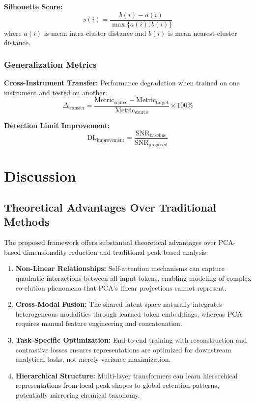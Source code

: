 \documentclass[12pt,a4paper]{article}
\begin{document}
\textbf{Silhouette Score:}
\begin{equation}
s(i) = \frac{b(i) - a(i)}{\max\{a(i), b(i)\}}
\end{equation}
where $a(i)$ is mean intra-cluster distance and $b(i)$ is mean nearest-cluster distance.

\subsubsection{Generalization Metrics}

\textbf{Cross-Instrument Transfer:} Performance degradation when trained on one instrument and tested on another:
\begin{equation}
\Delta_{\text{transfer}} = \frac{\text{Metric}_{\text{source}} - \text{Metric}_{\text{target}}}{\text{Metric}_{\text{source}}} \times 100\%
\end{equation}

\textbf{Detection Limit Improvement:}
\begin{equation}
\text{DL}_{\text{improvement}} = \frac{\text{SNR}_{\text{baseline}}}{\text{SNR}_{\text{proposed}}}
\end{equation}

\section{Discussion}

\subsection{Theoretical Advantages Over Traditional Methods}

The proposed framework offers substantial theoretical advantages over PCA-based dimensionality reduction and traditional peak-based analysis:

\begin{enumerate}
    \item \textbf{Non-Linear Relationships:} Self-attention mechanisms can capture quadratic interactions between all input tokens, enabling modeling of complex co-elution phenomena that PCA's linear projections cannot represent.
    
    \item \textbf{Cross-Modal Fusion:} The shared latent space naturally integrates heterogeneous modalities through learned token embeddings, whereas PCA requires manual feature engineering and concatenation.
    
    \item \textbf{Task-Specific Optimization:} End-to-end training with reconstruction and contrastive losses ensures representations are optimized for downstream analytical tasks, not merely variance maximization.
    
    \item \textbf{Hierarchical Structure:} Multi-layer transformers can learn hierarchical representations from local peak shapes to global retention patterns, potentially mirroring chemical taxonomy.
\end{enumerate}
\end{document}
